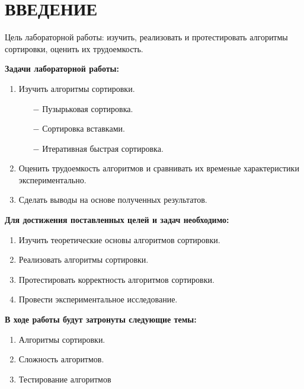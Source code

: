 \chapter{ВВЕДЕНИЕ}

Цель лабораторной работы: изучить, реализовать и протестировать алгоритмы сортировки,
оценить их трудоемкость.\newline


\textbf{Задачи лабораторной работы:}
\begin{enumerate}
\item Изучить алгоритмы сортировки.
\begin{enumerate}
    \item[$-$] Пузырьковая сортировка.
    \item[$-$] Сортировка вставками.
    \item[$-$] Итеративная быстрая сортировка.
\end{enumerate}
\item Оценить трудоемкость алгоритмов и сравнивать их временые характеристики экспериментально.
\item Сделать выводы на основе полученных результатов.
\end{enumerate}

\textbf{Для достижения поставленных целей и задач необходимо:}
\begin{enumerate}
    \item Изучить теоретические основы алгоритмов сортировки.
    \item Реализовать алгоритмы сортировки.
    \item Протестировать корректность алгоритмов сортировки.
    \item Провести экспериментальное исследование.
\end{enumerate}

\textbf{В ходе работы будут затронуты следующие темы:}
\begin{enumerate}
\item Алгоритмы сортировки.
\item Сложность алгоритмов.
\item Тестирование алгоритмов
\end{enumerate}
